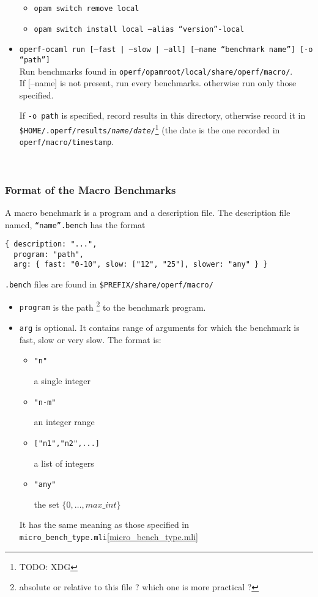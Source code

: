 \documentclass[11pt,a4paper]{article}
\begin{document}
\begin{itemize}
  \begin{itemize}
  \item {\tt opam switch remove local}
  \item {\tt opam switch install local --alias ``version''-local}
  \end{itemize}
\item {\tt operf-ocaml run [--fast | --slow | --all] [--name ``benchmark name''] [-o ``path'']}\\
  Run benchmarks found in {\tt operf/opamroot/local/share/operf/macro/}.\\
  If [--name] is not present, run every benchmarks.
  otherwise run only those specified.

  If {\tt -o path} is specified, record results in this directory,
  otherwise record it in {\tt
    \$HOME/.operf/results/{\em name}/{\em date}/}\footnote{TODO: XDG}
  (the date is the one recorded in {\tt operf/macro/timestamp}.

\end{itemize}

~\vspace{4cm}~

\subsubsection{Format of the Macro Benchmarks}

A macro benchmark is a program and a description file. The description
file named, {\tt ``name''.bench} has the format
\begin{verbatim}
{ description: "...",
  program: "path",
  arg: { fast: "0-10", slow: ["12", "25"], slower: "any" } }
\end{verbatim}

{\tt .bench} files are found in {\tt \$PREFIX/share/operf/macro/}

\begin{itemize}
\item {\tt program} is the path \footnote{absolute or relative to this
  file ? which one is more practical ?} to the benchmark program.
\item {\tt arg} is optional. It contains range of arguments for which
  the benchmark is fast, slow or very slow. The format is:
  \begin{itemize}
  \item \begin{verbatim}"n"\end{verbatim} a single integer
  \item \begin{verbatim}"n-m"\end{verbatim} an integer range
  \item \begin{verbatim}["n1","n2",...]\end{verbatim} a list of integers
  \item \begin{verbatim}"any"\end{verbatim} the set $\{0, \ldots, max\_int\}$
  \end{itemize}
  It has the same meaning as those specified in {\tt micro\_bench\_type.mli}\ref{micro_bench_type.mli}
\end{itemize}
\end{document}
